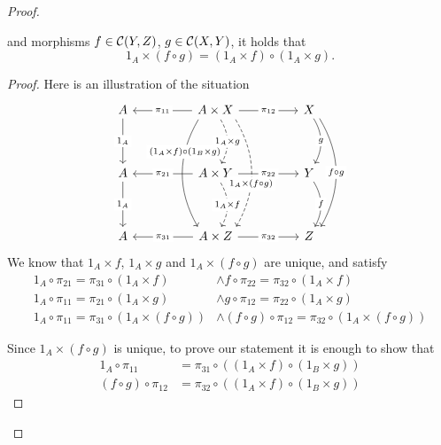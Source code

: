 \begin{solution}
\begin{proof}
\begin{lemma}
				and morphisms $f \in \mathcal{C}(Y, Z)$, $g \in \mathcal{C}(X, Y)$,
				it holds that
				\[
					1_A \times (f \circ g) = (1_A \times f) \circ (1_A \times g).
				\]
			\end{lemma}
			\begin{proof}
				Here is an illustration of the situation
				\[
					\begin{tikzcd}
						A && {A \times X} && X \\
						\\
						A && {A \times Y} && Y \\
						\\
						A && {A \times Z} && Z
						\arrow["{1_A}"{description}, from=1-1, to=3-1]
						\arrow["{1_A}"{description}, from=3-1, to=5-1]
						\arrow["g"{description}, bend left, from=1-5, to=3-5]
						\arrow["f"{description}, bend left, from=3-5, to=5-5]
						\arrow["{f \circ g}"{description}, bend left, shift left=2, from=1-5, to=5-5]
						\arrow["\pi_{11}"{description},from=1-3, to=1-1]
						\arrow["\pi_{12}"{description},from=1-3, to=1-5]
						\arrow["\pi_{21}"{description},from=3-3, to=3-1]
						\arrow["\pi_{22}"{description},from=3-3, to=3-5]
						\arrow["\pi_{31}"{description},from=5-3, to=5-1]
						\arrow["\pi_{32}"{description},from=5-3, to=5-5]
						\arrow["{1_A \times g}"{description}, bend left, dashed, from=1-3, to=3-3]
						\arrow["{1_A \times f}"{description}, bend left, dashed, from=3-3, to=5-3]
						\arrow["{1_A \times (f \circ g)}"{description, pos=0.6}, bend left, shift left=5, dashed, from=1-3, to=5-3]
						\arrow["{(1_A \times f) \circ (1_B \times g)}"{description, pos=0.3}, shift right=4, bend right, from=1-3, to=5-3]
					\end{tikzcd}
				\]
				We know that $1_A \times f$, $1_A \times g$ and $1_A \times (f \circ g)$ are unique, and satisfy
				\begin{align}
					1_A \circ \pi_{21} = \pi_{31} \circ (1_A \times f)           & \wedge f \circ \pi_{22} = \pi_{32} \circ (1_A \times f) \label{Hf}          \\
					1_A \circ \pi_{11} = \pi_{21} \circ (1_A \times g)           & \wedge g \circ \pi_{12} = \pi_{22} \circ (1_A \times g) \label{Hg}          \\
					1_A \circ \pi_{11} = \pi_{31} \circ (1_A \times (f \circ g)) & \wedge (f \circ g) \circ \pi_{12} = \pi_{32} \circ (1_A \times (f \circ g))
				\end{align}

				Since $1_A \times (f \circ g)$ is unique, to prove our statement it is enough to show that
				\begin{align}
					1_A \circ \pi_{11}         & = \pi_{31} \circ ((1_A \times f) \circ (1_B \times g)) \label{goal:left}  \\
					(f \circ g) \circ \pi_{12} & = \pi_{32} \circ ((1_A \times f) \circ (1_B \times g)) \label{goal:right}
				\end{align}


\end{proof}
\end{proof}
\end{solution}
